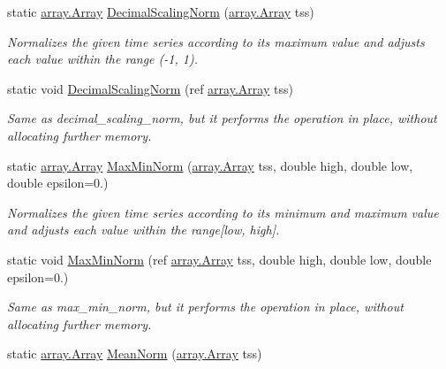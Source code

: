 \begin{DoxyCompactItemize}
\item 
static \mbox{\hyperlink{classkhiva_1_1array_1_1_array}{array.\+Array}} \mbox{\hyperlink{classkhiva_1_1normalization_1_1_normalization_a291b871a81c368b7d3319858edcf1de0}{Decimal\+Scaling\+Norm}} (\mbox{\hyperlink{classkhiva_1_1array_1_1_array}{array.\+Array}} tss)
\begin{DoxyCompactList}\small\item\em Normalizes the given time series according to its maximum value and adjusts each value within the range (-\/1, 1). \end{DoxyCompactList}\item 
static void \mbox{\hyperlink{classkhiva_1_1normalization_1_1_normalization_acfd4bed1b714bd16d51831c207db9c11}{Decimal\+Scaling\+Norm}} (ref \mbox{\hyperlink{classkhiva_1_1array_1_1_array}{array.\+Array}} tss)
\begin{DoxyCompactList}\small\item\em Same as decimal\+\_\+scaling\+\_\+norm, but it performs the operation in place, without allocating further memory. \end{DoxyCompactList}\item 
static \mbox{\hyperlink{classkhiva_1_1array_1_1_array}{array.\+Array}} \mbox{\hyperlink{classkhiva_1_1normalization_1_1_normalization_ab3eae533383b43c78d27aac6d61f257c}{Max\+Min\+Norm}} (\mbox{\hyperlink{classkhiva_1_1array_1_1_array}{array.\+Array}} tss, double high, double low, double epsilon=0.)
\begin{DoxyCompactList}\small\item\em Normalizes the given time series according to its minimum and maximum value and adjusts each value within the range\mbox{[}low, high\mbox{]}. \end{DoxyCompactList}\item 
static void \mbox{\hyperlink{classkhiva_1_1normalization_1_1_normalization_af484ba6fbbec31a345f085037d9f41de}{Max\+Min\+Norm}} (ref \mbox{\hyperlink{classkhiva_1_1array_1_1_array}{array.\+Array}} tss, double high, double low, double epsilon=0.)
\begin{DoxyCompactList}\small\item\em Same as max\+\_\+min\+\_\+norm, but it performs the operation in place, without allocating further memory. \end{DoxyCompactList}\item 
static \mbox{\hyperlink{classkhiva_1_1array_1_1_array}{array.\+Array}} \mbox{\hyperlink{classkhiva_1_1normalization_1_1_normalization_a415116b28fbc879cb8d303d23fa27960}{Mean\+Norm}} (\mbox{\hyperlink{classkhiva_1_1array_1_1_array}{array.\+Array}} tss)

\end{DoxyCompactItemize}
